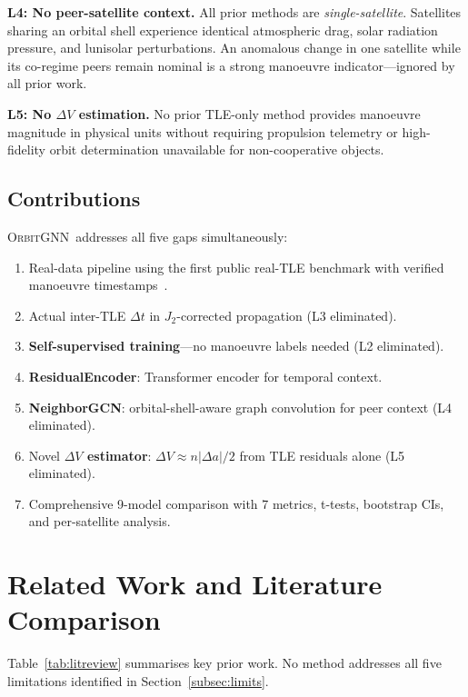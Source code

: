 \documentclass[journal]{IEEEtran}
\newcommand{\orbitgnn}{\textsc{OrbitGNN}}
\begin{document}
\textbf{L4: No peer-satellite context.} All prior methods are
\emph{single-satellite}. Satellites sharing an orbital shell experience
identical atmospheric drag, solar radiation pressure, and lunisolar
perturbations. An anomalous change in one satellite while its co-regime
peers remain nominal is a strong manoeuvre indicator---ignored by all
prior work.

\textbf{L5: No $\Delta V$ estimation.} No prior TLE-only method provides
manoeuvre magnitude in physical units without requiring propulsion telemetry
or high-fidelity orbit determination unavailable for non-cooperative objects.

\subsection{Contributions}
\orbitgnn\ addresses all five gaps simultaneously:
\begin{enumerate}
  \item Real-data pipeline using the first public real-TLE benchmark
        with verified manoeuvre timestamps~\cite{shorten2023}.
  \item Actual inter-TLE $\Delta t$ in $J_2$-corrected propagation
        (L3 eliminated).
  \item \textbf{Self-supervised training}---no manoeuvre labels needed
        (L2 eliminated).
  \item \textbf{ResidualEncoder}: Transformer encoder for temporal context.
  \item \textbf{NeighborGCN}: orbital-shell-aware graph convolution for
        peer context (L4 eliminated).
  \item Novel \textbf{$\Delta V$ estimator}: $\Delta V \approx n|\Delta a|/2$
        from TLE residuals alone (L5 eliminated).
  \item Comprehensive 9-model comparison with 7 metrics, t-tests,
        bootstrap CIs, and per-satellite analysis.
\end{enumerate}

\section{Related Work and Literature Comparison}

Table~\ref{tab:litreview} summarises key prior work. No method
addresses all five limitations identified in Section~\ref{subsec:limits}.
\end{document}
